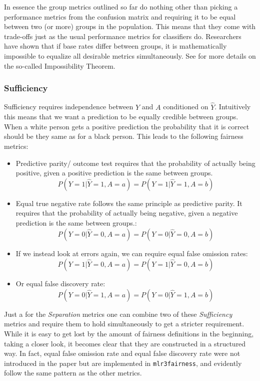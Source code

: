 In essence the group metrics outlined so far do nothing other than picking a performance metrics from the confusion matrix and requiring it to be equal between two (or more) groups in the population.
This means that they come with trade-offs just as the usual performance metrics for classifiers do. Researchers have shown that if base rates differ between groups, it is mathematically impossible to equalize all desirable metrics simultaneously. See for more details on the so-called Impossibility Theorem.

\subsubsection*{Sufficiency}
Sufficiency requires independence between $Y$ and $A$ conditioned on $\hat{Y}$. Intuitively this means that we want a prediction to be equally credible between groups. When a white person gets a positive prediction the probability that it is correct should be they same as for a black person. This leads to the following fairness metrics:
\begin{itemize}
    \item Predictive parity/ outcome test requires that the probability of actually being positive, given a positive prediction is the same between groups. $$P(Y = 1 | \hat{Y} = 1, A = a) = P(Y = 1 | \hat{Y} = 1, A = b)$$
    \item Equal true negative rate follows the same principle as predictive parity. It requires that the probability of actually being negative, given a negative prediction is the same between groups.: $$P(Y = 0 | \hat{Y} = 0, A = a) = P(Y = 0 | \hat{Y} = 0, A = b)$$
    \item If we instead look at errors again, we can require equal false omission rates: $$P(Y = 1 | \hat{Y} = 0, A = a) = P(Y = 1 | \hat{Y} = 0, A = b)$$
    \item Or equal false discovery rate: $$P(Y = 0 | \hat{Y} = 1, A = a) = P(Y = 0 | \hat{Y} = 1, A = b)$$
\end{itemize}

Just a for the \textit{Separation} metrics one can combine two of these  \textit{Sufficiency} metrics and require them to hold simultaneously to get a stricter requirement.
While it is easy to get lost by the amount of fairness definitions in the beginning, taking a closer look, it becomes clear that they are constructed in a structured way. In fact, equal false omission rate and equal false discovery rate were not introduced in the paper \cite{verma2018} but are implemented in \texttt{mlr3fairness}, and evidently follow the same pattern as the other metrics.

